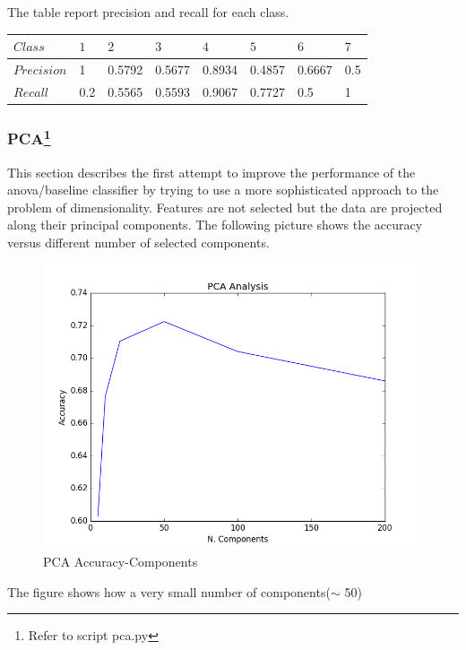 \documentclass[a4paper,10pt]{article}
\begin{document}
      The table report precision and recall for each class.
      \begin{table}[H]
      	\centering
	\begin{tabular}{l|P{1cm}P{1cm}P{1cm}P{1cm}P{1cm}P{1cm}P{1cm}} \toprule
	  {$Class$} & {$1$} & {$2$} & {$3$} & {$4$} & {$5$} & {$6$} & {$7$} \\ \midrule
	  $Precision$  & 1 & 0.5792 & 0.5677 & 0.8934  & 0.4857 &  0.6667  & 0.5 \\ \midrule
	  $Recall$  & 0.2 &  0.5565 &  0.5593 & 0.9067 & 0.7727  & 0.5 & 1  \\ \bottomrule
	\end{tabular}
      \end{table}
      
     \subsubsection{PCA\protect\footnote{Refer to script pca.py}}
      This section describes the first attempt to improve the performance of the anova/baseline classifier by trying to use a more 
      sophisticated approach to the problem of dimensionality. 
      Features are not selected but the data are projected along their principal components.\newline
      The following picture shows the accuracy versus different number of selected components.
      \begin{figure}[H]
	\centering
	\includegraphics[scale=0.5]{pca-acc.png}
	\caption{PCA Accuracy-Components}
      \end{figure}
      \noindent The figure shows how a very small number of components($\sim$ 50) 
\end{document}

